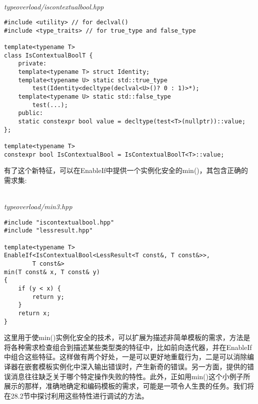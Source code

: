 \hspace*{\fill} \\ %
\noindent
\textit{typeoverload/iscontextualbool.hpp}
\begin{lstlisting}[style=styleCXX]
#include <utility> // for declval()
#include <type_traits> // for true_type and false_type

template<typename T>
class IsContextualBoolT {
	private:
	template<typename T> struct Identity;
	template<typename U> static std::true_type
		test(Identity<decltype(declval<U>()? 0 : 1)>*);
	template<typename U> static std::false_type
		test(...);
	public:
	static constexpr bool value = decltype(test<T>(nullptr))::value;
};

template<typename T>
constexpr bool IsContextualBool = IsContextualBoolT<T>::value;
\end{lstlisting}

有了这个新特征，可以在EnableIf中提供一个实例化安全的min()，其包含正确的需求集:

\hspace*{\fill} \\ %
\noindent
\textit{typeoverload/min3.hpp}
\begin{lstlisting}[style=styleCXX]
#include "iscontextualbool.hpp"
#include "lessresult.hpp"

template<typename T>
EnableIf<IsContextualBool<LessResult<T const&, T const&>>,
		T const&>
min(T const& x, T const& y)
{
	if (y < x) {
		return y;
	}
	return x;
}
\end{lstlisting}

这里用于使min()实例化安全的技术，可以扩展为描述非简单模板的需求，方法是将各种需求检查组合到描述某些类型类的特征中，比如前向迭代器，并在EnableIf中组合这些特征。这样做有两个好处，一是可以更好地重载行为，二是可以消除编译器在嵌套模板实例化中深入输出错误时，产生新奇的错误。另一方面，提供的错误消息往往缺乏关于哪个特定操作失败的特性。此外，正如用min()这个小例子所展示的那样，准确地确定和编码模板的需求，可能是一项令人生畏的任务。我们将在28.2节中探讨利用这些特性进行调试的方法。





